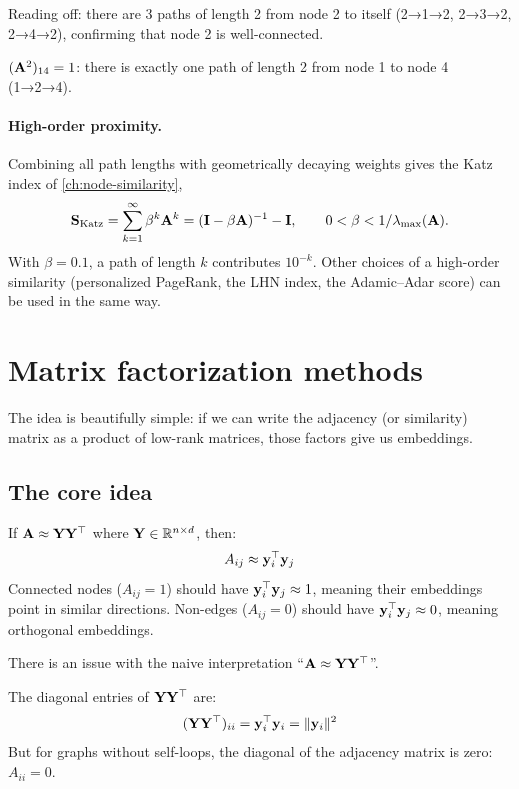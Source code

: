 \begin{notechapter}
\begin{example}
Reading off: there are 3 paths of length 2 from node 2 to itself (2→1→2, 2→3→2, 2→4→2), confirming that node 2 is well-connected.

$(\mathbf{A}^2)_{14} = 1$: there is exactly one path of length 2 from node 1 to node 4 (1→2→4).
\end{example}

\paragraph{High-order proximity.} Combining all path lengths with geometrically decaying weights gives the Katz index of \cref{ch:node-similarity},
\[
\mathbf{S}_{\text{Katz}} = \sum_{k=1}^{\infty} \beta^k \mathbf{A}^k = (\mathbf{I} - \beta\mathbf{A})^{-1} - \mathbf{I}, \qquad 0 < \beta < 1/\lambda_{\max}(\mathbf{A}).
\]
With $\beta = 0.1$, a path of length $k$ contributes $10^{-k}$. Other choices of a high-order similarity (personalized PageRank, the LHN index, the Adamic--Adar score) can be used in the same way.

\section{Matrix factorization methods}

The idea is beautifully simple: if we can write the adjacency (or similarity) matrix as a product of low-rank matrices, those factors give us embeddings.

\subsection{The core idea}

\begin{keyidea}
If $\mathbf{A} \approx \mathbf{Y} \mathbf{Y}^\top$ where $\mathbf{Y} \in \mathbb{R}^{n \times d}$, then:
\[
A_{ij} \approx \mathbf{y}_i^\top \mathbf{y}_j
\]
Connected nodes ($A_{ij} = 1$) should have $\mathbf{y}_i^\top \mathbf{y}_j \approx 1$, meaning their embeddings point in similar directions. Non-edges ($A_{ij} = 0$) should have $\mathbf{y}_i^\top \mathbf{y}_j \approx 0$, meaning orthogonal embeddings.
\end{keyidea}

\begin{pitfall}
There is an issue with the naive interpretation ``$\mathbf{A} \approx \mathbf{Y}\mathbf{Y}^\top$''.

The diagonal entries of $\mathbf{Y} \mathbf{Y}^\top$ are:
\[
(\mathbf{Y} \mathbf{Y}^\top)_{ii} = \mathbf{y}_i^\top \mathbf{y}_i = \|\mathbf{y}_i\|^2
\]
But for graphs without self-loops, the diagonal of the adjacency matrix is zero: $A_{ii} = 0$.


\end{pitfall}
\end{notechapter}
